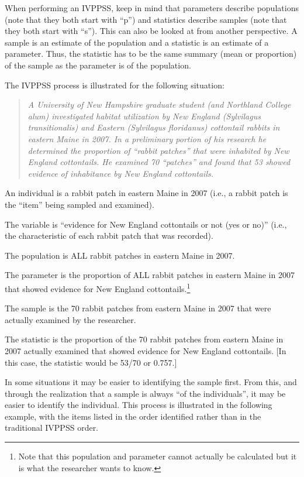 \documentclass[10pt,openany]{book}\usepackage[]{graphicx}\usepackage[]{color}
\begin{document}
When performing an IVPPSS, keep in mind that parameters describe populations (note that they both start with ``p'') and statistics describe samples (note that they both start with ``s'').  This can also be looked at from another perspective.  A sample is an estimate of the population and a statistic is an estimate of a parameter.  Thus, the statistic has to be the same summary (mean or proportion) of the sample as the parameter is of the population.

The IVPPSS process is illustrated for the following situation:
\vspace{-12pt}
\begin{quote}
\textit{A University of New Hampshire graduate student (and Northland College alum) investigated habitat utilization by New England (Sylvilagus transitionalis) and Eastern (Sylvilagus floridanus) cottontail rabbits in eastern Maine in 2007.  In a preliminary portion of his research he determined the proportion of ``rabbit patches'' that were inhabited by New England cottontails.  He examined 70 ``patches'' and found that 53 showed evidence of inhabitance by New England cottontails.}
\end{quote}

\begin{Itemize}
  \item An individual is a rabbit patch in eastern Maine in 2007 (i.e., a rabbit patch is the ``item'' being sampled and examined).
  \item The variable is ``evidence for New England cottontails or not (yes or no)'' (i.e., the characteristic of each rabbit patch that was recorded).
  \item The population is ALL rabbit patches in eastern Maine in 2007.
  \item The parameter is the proportion of ALL rabbit patches in eastern Maine in 2007 that showed evidence for New England cottontails.\footnote{Note that this population and parameter cannot actually be calculated but it is what the researcher wants to know.}
  \item The sample is the 70 rabbit patches from eastern Maine in 2007 that were actually examined by the researcher.
  \item The statistic is the proportion of the 70 rabbit patches from eastern Maine in 2007 actually examined that showed evidence for New England cottontails. [In this case, the statistic would be 53/70 or 0.757.]
\end{Itemize}

In some situations it may be easier to identifying the sample first.  From this, and through the realization that a sample is always ``of the individuals'', it may be easier to identify the individual.  This process is illustrated in the following example, with the items listed in the order identified rather than in the traditional IVPPSS order.
\end{document}
